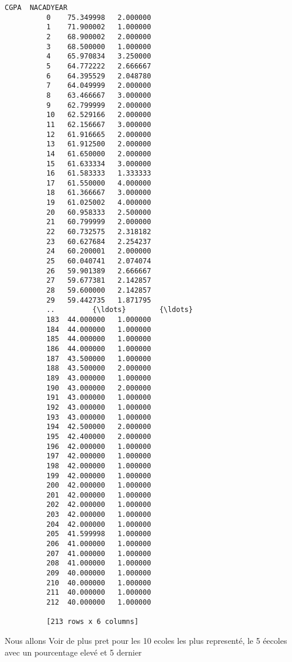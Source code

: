 \documentclass[11pt]{article}
\begin{document}
\begin{Verbatim}[commandchars=\\\{\}]
                    CGPA  NACADYEAR  
          0    75.349998   2.000000  
          1    71.900002   1.000000  
          2    68.900002   2.000000  
          3    68.500000   1.000000  
          4    65.970834   3.250000  
          5    64.772222   2.666667  
          6    64.395529   2.048780  
          7    64.049999   2.000000  
          8    63.466667   3.000000  
          9    62.799999   2.000000  
          10   62.529166   2.000000  
          11   62.156667   3.000000  
          12   61.916665   2.000000  
          13   61.912500   2.000000  
          14   61.650000   2.000000  
          15   61.633334   3.000000  
          16   61.583333   1.333333  
          17   61.550000   4.000000  
          18   61.366667   3.000000  
          19   61.025002   4.000000  
          20   60.958333   2.500000  
          21   60.799999   2.000000  
          22   60.732575   2.318182  
          23   60.627684   2.254237  
          24   60.200001   2.000000  
          25   60.040741   2.074074  
          26   59.901389   2.666667  
          27   59.677381   2.142857  
          28   59.600000   2.142857  
          29   59.442735   1.871795  
          ..         {\ldots}        {\ldots}  
          183  44.000000   1.000000  
          184  44.000000   1.000000  
          185  44.000000   1.000000  
          186  44.000000   1.000000  
          187  43.500000   1.000000  
          188  43.500000   2.000000  
          189  43.000000   1.000000  
          190  43.000000   2.000000  
          191  43.000000   1.000000  
          192  43.000000   1.000000  
          193  43.000000   1.000000  
          194  42.500000   2.000000  
          195  42.400000   2.000000  
          196  42.000000   1.000000  
          197  42.000000   1.000000  
          198  42.000000   1.000000  
          199  42.000000   1.000000  
          200  42.000000   1.000000  
          201  42.000000   1.000000  
          202  42.000000   1.000000  
          203  42.000000   1.000000  
          204  42.000000   1.000000  
          205  41.599998   1.000000  
          206  41.000000   1.000000  
          207  41.000000   1.000000  
          208  41.000000   1.000000  
          209  40.000000   1.000000  
          210  40.000000   1.000000  
          211  40.000000   1.000000  
          212  40.000000   1.000000  
          
          [213 rows x 6 columns]
\end{Verbatim}
        
    Nous allons Voir de plus pret pour les 10 ecoles les plus representé, le
5 éecoles avec un pourcentage elevé et 5 dernier
\end{document}
